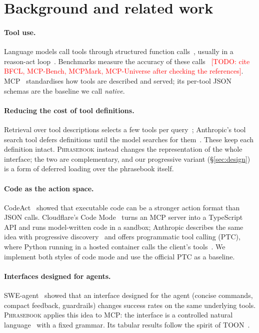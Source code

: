 \documentclass[11pt]{article}
\newcommand{\todo}[1]{\textcolor{red}{[TODO: #1]}}
\newcommand{\pb}{\textsc{Phrasebook}}
\begin{document}
\section{Background and related work}
\label{sec:related}

\paragraph{Tool use.} Language models call tools through structured function calls~\cite{schick2023toolformer,patil2023gorilla,qin2024toolllm}, usually in a reason-act loop~\cite{yao2023react}. Benchmarks measure the accuracy of these calls~\cite{yao2024taubench} \todo{cite BFCL, MCP-Bench, MCPMark, MCP-Universe after checking the references}. MCP~\cite{mcp2024} standardises how tools are described and served; its per-tool JSON schemas are the baseline we call \emph{native}.

\paragraph{Reducing the cost of tool definitions.} Retrieval over tool descriptions selects a few tools per query~\cite{gan2025ragmcp}; Anthropic's tool search tool defers definitions until the model searches for them~\cite{anthropic2025advanced}. These keep each definition intact. \pb{} instead changes the representation of the whole interface; the two are complementary, and our progressive variant (\S\ref{sec:design}) is a form of deferred loading over the phrasebook itself.

\paragraph{Code as the action space.} CodeAct~\cite{wang2024codeact} showed that executable code can be a stronger action format than JSON calls. Cloudflare's Code Mode~\cite{cloudflare2025codemode} turns an MCP server into a TypeScript API and runs model-written code in a sandbox; Anthropic describes the same idea with progressive discovery~\cite{anthropic2025codeexec} and offers programmatic tool calling (PTC), where Python running in a hosted container calls the client's tools~\cite{anthropic2025advanced}. We implement both styles of code mode and use the official PTC as a baseline.

\paragraph{Interfaces designed for agents.} SWE-agent~\cite{yang2024sweagent} showed that an interface designed for the agent (concise commands, compact feedback, guardrails) changes success rates on the same underlying tools. \pb{} applies this idea to MCP: the interface is a controlled natural language~\cite{kuhn2014cnl} with a fixed grammar. Its tabular results follow the spirit of TOON~\cite{toon2025}.
\end{document}
